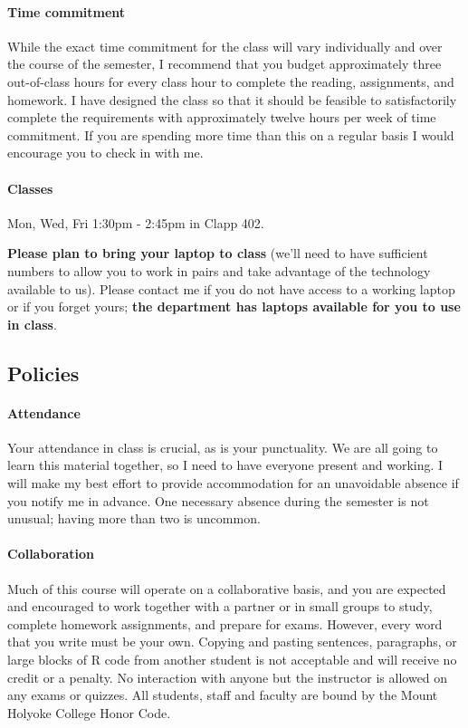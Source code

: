 \documentclass[11pt]{article}
\begin{document}
\paragraph{Time commitment}

While the exact time commitment for the class will vary individually and over the course of the semester, I recommend that you budget approximately three out-of-class hours for every class hour to complete the reading, assignments, and homework.  I have designed the class so that it should be feasible to satisfactorily complete the requirements with approximately twelve hours per week of time commitment.  If you are spending more time than this on a regular basis I would encourage you to check in with me.

\paragraph{Classes} \mbox{}

Mon, Wed, Fri 1:30pm - 2:45pm in Clapp 402.

\textbf{Please plan to bring your laptop to class} (we'll need to have sufficient numbers to allow you to work in pairs and take advantage of the technology available to us).  Please contact me if you do not have access to a working laptop or if you forget yours; \textbf{the department has laptops available for you to use in class}.

\subsection*{Policies}

\paragraph{Attendance}
Your attendance in class is crucial, as is your punctuality. We are all going to learn this material together, so I need to have everyone present and working. I will make my best effort to provide accommodation for an unavoidable absence if you notify me in advance. 
One necessary absence during the semester is not unusual; having more than two is uncommon.

\paragraph{Collaboration}
Much of this course will operate on a collaborative basis, and you are expected and encouraged to work together with a partner or in small groups to study, complete homework assignments, and prepare for exams. However, every word that you write must be your own. Copying and pasting sentences, paragraphs, or large blocks of R code from another student is not acceptable and will receive no credit or a penalty. No interaction with 
anyone but the instructor is allowed on any exams or quizzes.  All students, staff and faculty are bound by the Mount Holyoke College Honor Code.
\end{document}
